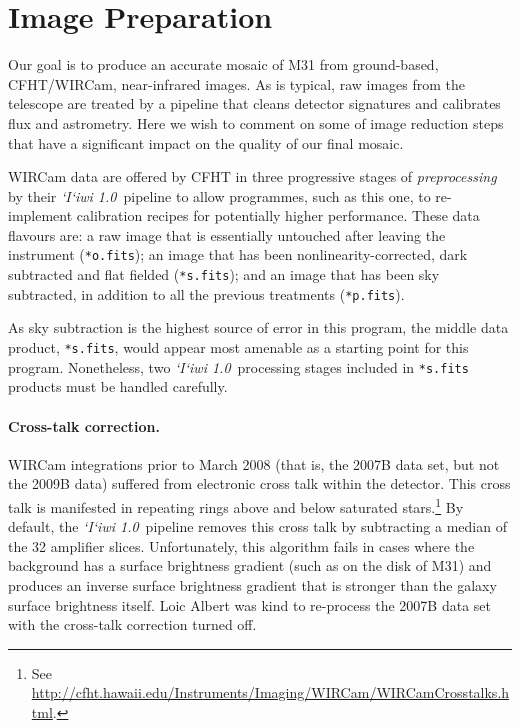 \documentclass[iop]{emulateapj}
\newcommand{\sw}[1]{\textit{#1}} %
\newcommand{\iiwione}{\sw{`I`iwi 1.0}}
\begin{document}

\section{Image Preparation}
\label{sec:reduction}

Our goal is to produce an accurate mosaic of M31 from ground-based, CFHT/WIRCam, near-infrared images. As is typical, raw images from the telescope are treated by a pipeline that cleans detector signatures and calibrates flux and astrometry. Here we wish to comment on some of image reduction steps that have a significant impact on the quality of our final mosaic.

WIRCam data are offered by CFHT in three progressive stages of \emph{preprocessing} by their \iiwione\ pipeline to allow programmes, such as this one, to re-implement calibration recipes for potentially higher performance. These data flavours are: a raw image that is essentially untouched after leaving the instrument (\texttt{*o.fits}); an image that has been nonlinearity-corrected, dark subtracted and flat fielded (\texttt{*s.fits}); and an image that has been sky subtracted, in addition to all the previous treatments (\texttt{*p.fits}).

As sky subtraction is the highest source of error in this program, the middle data product, \texttt{*s.fits}, would appear most amenable as a starting point for this program. Nonetheless, two \iiwione\ processing stages included in \texttt{*s.fits} products must be handled carefully.

\paragraph{Cross-talk correction.} WIRCam integrations prior to March 2008 (that is, the 2007B data set, but not the 2009B data) suffered from electronic cross talk within the detector. This cross talk is manifested in repeating rings above and below saturated stars.\footnote{See \url{http://cfht.hawaii.edu/Instruments/Imaging/WIRCam/WIRCamCrosstalks.html}.} By default, the \iiwione\ pipeline removes this cross talk by subtracting a median of the 32 amplifier slices. Unfortunately, this algorithm fails in cases where the background has a surface brightness gradient (such as on the disk of M31) and produces an inverse surface brightness gradient that is stronger than the galaxy surface brightness itself. Loic Albert was kind to re-process the 2007B data set with the cross-talk correction turned off.
\end{document}
